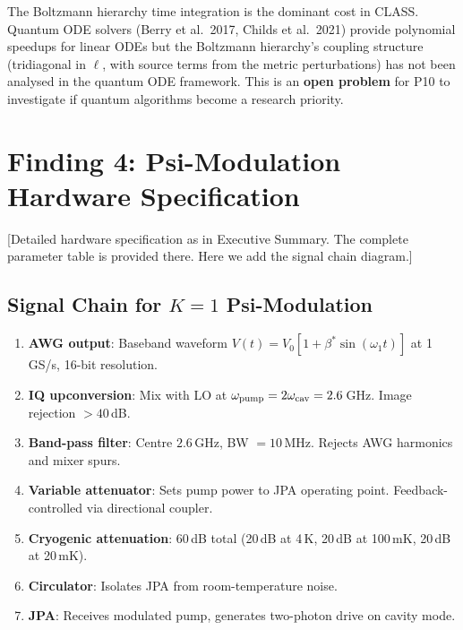 \documentclass[11pt]{article}
\theoremstyle{definition}
\theoremstyle{remark}
\begin{document}
The Boltzmann hierarchy time integration is the dominant cost in CLASS.
Quantum ODE solvers (Berry et al.\ 2017, Childs et al.\ 2021) provide
polynomial speedups for linear ODEs but the Boltzmann hierarchy's
coupling structure (tridiagonal in $\ell$, with source terms from the
metric perturbations) has not been analysed in the quantum ODE
framework.  This is an \textbf{open problem} for P10 to investigate
if quantum algorithms become a research priority.

\section{Finding 4: Psi-Modulation Hardware Specification}
\label{sec:hardware-spec}

[Detailed hardware specification as in Executive Summary.  The complete
parameter table is provided there.  Here we add the signal chain
diagram.]

\subsection{Signal Chain for $K=1$ Psi-Modulation}

\begin{enumerate}
  \item \textbf{AWG output}: Baseband waveform
    $V(t) = V_0 [1 + \beta^* \sin(\omega_1 t)]$ at 1\,GS/s,
    16-bit resolution.
  \item \textbf{IQ upconversion}: Mix with LO at $\omega_{\rm pump}
    = 2\omega_{\rm cav} = 2.6$\,GHz.  Image rejection $> 40$\,dB.
  \item \textbf{Band-pass filter}: Centre $2.6$\,GHz, BW $= 10$\,MHz.
    Rejects AWG harmonics and mixer spurs.
  \item \textbf{Variable attenuator}: Sets pump power to JPA operating
    point.  Feedback-controlled via directional coupler.
  \item \textbf{Cryogenic attenuation}: $60$\,dB total (20\,dB at
    4\,K, 20\,dB at 100\,mK, 20\,dB at 20\,mK).
  \item \textbf{Circulator}: Isolates JPA from room-temperature noise.
  \item \textbf{JPA}: Receives modulated pump, generates two-photon
    drive on cavity mode.
\end{enumerate}
\end{document}
